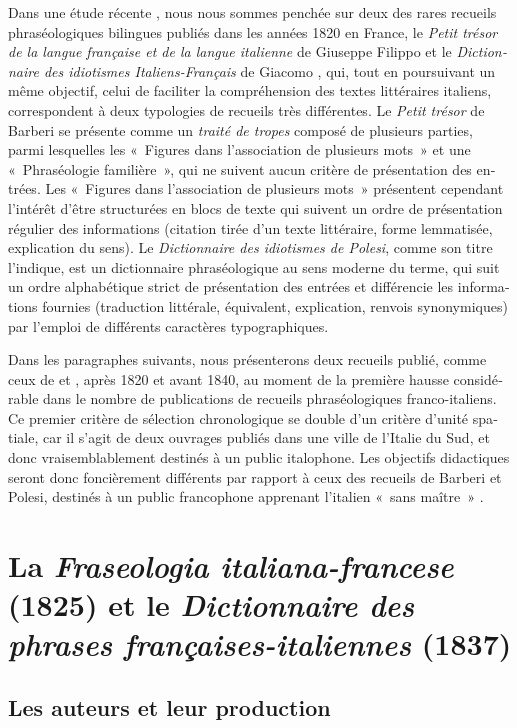 \documentclass[output=paper,booklanguage=french]{langscibook}
\begin{document}
\begin{otherlanguage}{french}
Dans une étude récente \citep{Murano2020}, nous nous sommes penchée sur deux des rares recueils phraséologiques bilingues publiés dans les années 1820 en France, le \emph{Petit trésor de la langue française et de la langue italienne} de Giuseppe Filippo \citet{Barberi1821} et le \emph{Dictionnaire des idiotismes Italiens-Français} de Giacomo \citet{Polesi1829}, qui, tout en poursuivant un même objectif, celui de faciliter la compréhension des textes littéraires italiens, correspondent à deux typologies de recueils très différentes. Le \emph{Petit trésor} de Barberi se présente comme un \emph{traité de tropes} composé de plusieurs parties, parmi lesquelles les «~Figures dans l’association de plusieurs mots~» et une «~Phraséologie familière~», qui ne suivent aucun critère de présentation des entrées. Les «~Figures dans l’association de plusieurs mots~» présentent cependant l’intérêt d’être structurées en blocs de texte qui suivent un ordre de présentation régulier des informations (citation tirée d’un texte littéraire, forme lemmatisée, explication du sens). Le \emph{Dictionnaire des idiotismes de Polesi}, comme son titre l’indique, est un dictionnaire phraséologique au sens moderne du terme, qui suit un ordre alphabétique strict de présentation des entrées et différencie les informations fournies (traduction littérale, équivalent, explication, renvois synonymiques) par l’emploi de différents caractères typographiques.

Dans les paragraphes suivants, nous présenterons deux recueils publié, comme ceux de \citet{Barberi1821} et \citet{Polesi1829}, après 1820 et avant 1840, au moment de la première hausse considérable dans le nombre de publications de recueils phraséologiques franco-italiens. Ce premier critère de sélection chronologique se double d’un critère d’unité spatiale, car il s’agit de deux ouvrages publiés dans une ville de l’Italie du Sud, et donc vraisemblablement destinés à un public italophone. Les objectifs didactiques seront donc foncièrement différents par rapport à ceux des recueils de Barberi et Polesi, destinés à un public francophone apprenant l’italien «~sans maître~» \citep[16]{Dubois2015}.

\section{La \emph{Fraseologia italiana-francese} (1825) et le \emph{Dictionnaire des phrases françaises-italiennes} (1837)}

\subsection{Les auteurs et leur production}


\end{otherlanguage}
\end{document}
